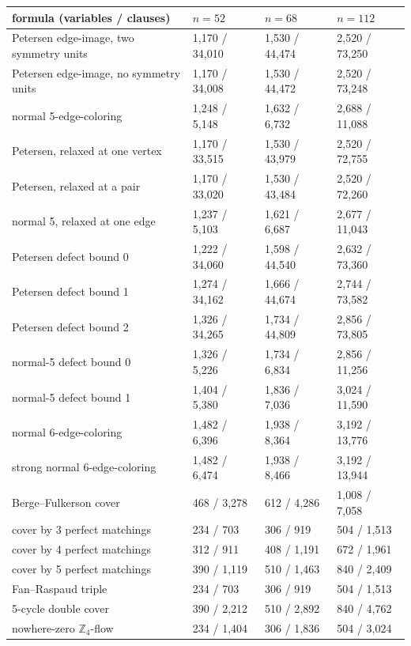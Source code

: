 \begin{tabular}{llll}
\toprule
formula (variables / clauses) & $n=52$ & $n=68$ & $n=112$\\
\midrule
Petersen edge-image, two symmetry units & 1{,}170 / 34{,}010 & 1{,}530 / 44{,}474 & 2{,}520 / 73{,}250\\
Petersen edge-image, no symmetry units & 1{,}170 / 34{,}008 & 1{,}530 / 44{,}472 & 2{,}520 / 73{,}248\\
normal 5-edge-coloring & 1{,}248 / 5{,}148 & 1{,}632 / 6{,}732 & 2{,}688 / 11{,}088\\
Petersen, relaxed at one vertex & 1{,}170 / 33{,}515 & 1{,}530 / 43{,}979 & 2{,}520 / 72{,}755\\
Petersen, relaxed at a pair & 1{,}170 / 33{,}020 & 1{,}530 / 43{,}484 & 2{,}520 / 72{,}260\\
normal 5, relaxed at one edge & 1{,}237 / 5{,}103 & 1{,}621 / 6{,}687 & 2{,}677 / 11{,}043\\
Petersen defect bound 0 & 1{,}222 / 34{,}060 & 1{,}598 / 44{,}540 & 2{,}632 / 73{,}360\\
Petersen defect bound 1 & 1{,}274 / 34{,}162 & 1{,}666 / 44{,}674 & 2{,}744 / 73{,}582\\
Petersen defect bound 2 & 1{,}326 / 34{,}265 & 1{,}734 / 44{,}809 & 2{,}856 / 73{,}805\\
normal-5 defect bound 0 & 1{,}326 / 5{,}226 & 1{,}734 / 6{,}834 & 2{,}856 / 11{,}256\\
normal-5 defect bound 1 & 1{,}404 / 5{,}380 & 1{,}836 / 7{,}036 & 3{,}024 / 11{,}590\\
normal 6-edge-coloring & 1{,}482 / 6{,}396 & 1{,}938 / 8{,}364 & 3{,}192 / 13{,}776\\
strong normal 6-edge-coloring & 1{,}482 / 6{,}474 & 1{,}938 / 8{,}466 & 3{,}192 / 13{,}944\\
Berge--Fulkerson cover & 468 / 3{,}278 & 612 / 4{,}286 & 1{,}008 / 7{,}058\\
cover by 3 perfect matchings & 234 / 703 & 306 / 919 & 504 / 1{,}513\\
cover by 4 perfect matchings & 312 / 911 & 408 / 1{,}191 & 672 / 1{,}961\\
cover by 5 perfect matchings & 390 / 1{,}119 & 510 / 1{,}463 & 840 / 2{,}409\\
Fan--Raspaud triple & 234 / 703 & 306 / 919 & 504 / 1{,}513\\
5-cycle double cover & 390 / 2{,}212 & 510 / 2{,}892 & 840 / 4{,}762\\
nowhere-zero $\mathbb Z_4$-flow & 234 / 1{,}404 & 306 / 1{,}836 & 504 / 3{,}024\\

\end{tabular}

